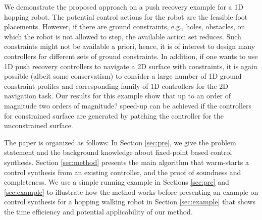 







We demonstrate the proposed approach on a push recovery example for a 1D hopping {\color{purple}} robot. The potential control actions for the robot are the feasible foot placements. However, if there are ground constraints, e.g., holes, obstacles, on which the robot is not allowed to step, the available action set reduces. Such constraints might not be available a priori, hence, it is of interest to design many controllers for different sets of ground constraints. In addition, if one wants to use 1D push recovery controllers to navigate a 2D surface with constraints, it is again possible (albeit some conservatism) to consider a large number of 1D ground constraint profiles and corresponding family of 1D controllers for the 2D navigation task. Our results for this example show that up to an order of magnitude {\color{purple} two orders of magnitude?} speed-up can be achieved if the controllers for constrained surface are generated by patching the controller for the unconstrained surface.  



The paper is organized as follows: In Section \ref{sec:pre}, we give the problem statement and the background knowledge about fixed-point based control synthesis. Section \ref{sec:method} presents the main algorithm that warm-starts a control synthesis from an existing controller, and the proof of soundness and completeness. We use a simple running example in Sections \ref{sec:pre} and \ref{sec:example} to illustrate how the method works before presenting an example on control synthesis for a hopping {\color{purple} walking} robot in Section \ref{sec:example} that shows the time efficiency and potential applicability of our method.

